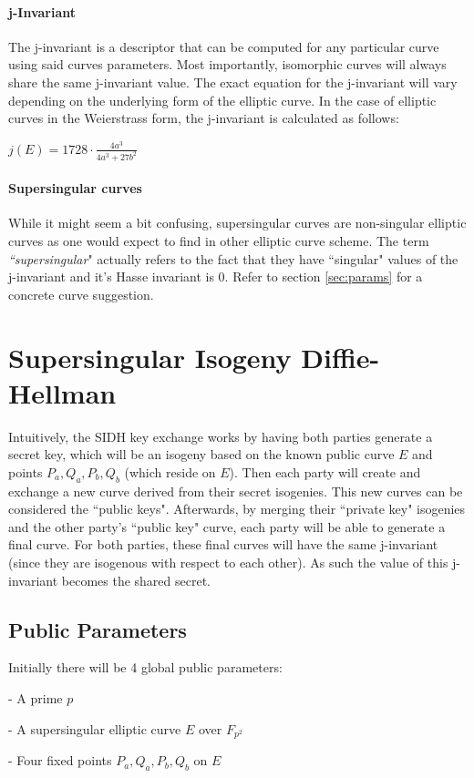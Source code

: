 \documentclass[10pt,twocolumn]{article} %
\begin{document}
\paragraph{j-Invariant}
The j-invariant is a descriptor that can be computed for any particular curve using said curves parameters. Most importantly, isomorphic curves will always share the same j-invariant value. The exact equation for the j-invariant will vary depending on the underlying form of the elliptic curve. In the case of elliptic curves in the Weierstrass form, the j-invariant is calculated as follows:

\begin{center}
	\centering
	$j(E)=1728\cdot\frac{4a^3}{4a^3+27b^2}$
\end{center}


\paragraph{Supersingular curves} While it might seem a bit confusing, supersingular curves are non-singular elliptic curves as one would expect to find in other elliptic curve scheme. The term \textit{``supersingular}" actually refers to the fact that they have ``singular" values of the j-invariant and it's Hasse invariant is 0. Refer to section \ref{sec:params} for a concrete curve suggestion.

\section{Supersingular Isogeny Diffie-Hellman}
Intuitively, the SIDH key exchange works by having both parties generate a secret key, which will be an isogeny based on the known public curve $E$ and points $P_a,Q_a,P_b,Q_b$ (which reside on $E$). Then each party will create and exchange a new curve derived from their secret isogenies. This new curves can be considered the ``public keys". Afterwards, by merging their ``private key" isogenies and the other party's ``public key" curve, each party will be able to generate a final curve. For both parties, these final curves will have the same j-invariant (since they are isogenous with respect to each other). As such the value of this j-invariant becomes the shared secret.

\subsection{Public Parameters}
Initially there will be 4 global public parameters:
\par - A prime $p$ 
\par - A supersingular elliptic curve $E$ over $F_{p^2}$
\par - Four fixed points $P_a,Q_a,P_b,Q_b$ on $E$ 
\end{document}
